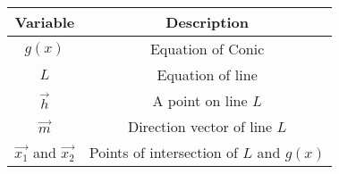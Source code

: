 \begin{tabular}[15pt]{ |c| c|}
    \hline
    \textbf{Variable} & \textbf{Description}\\ 
    \hline
	$g(x)$ & Equation of Conic \\
    \hline 
	$L$ & Equation of line \\
	\hline
	$\vec{h}$ & A point on line $L$ \\
    \hline
	$\vec{m}$ & Direction vector of line $L$ \\
	\hline
	$\vec{x_1}$ and $\vec{x_2}$ & Points of intersection of $L$ and $g(x)$ \\
	\hline
    \end{tabular}
